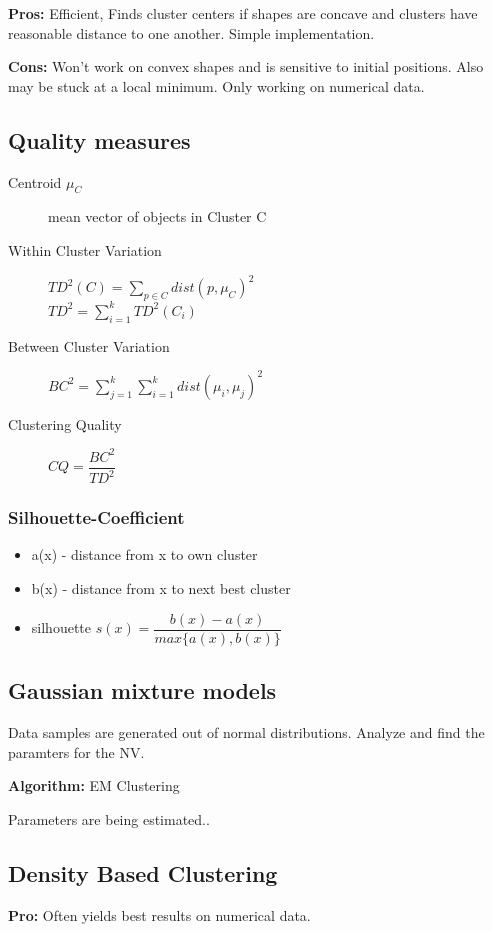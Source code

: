 \documentclass[fleqn, oneside, 10pt, titlepage]{article}
\begin{document}
\textbf{Pros:} Efficient, Finds cluster centers if shapes are concave and clusters have reasonable distance to one another. Simple implementation.

\textbf{Cons:} Won't work on convex shapes and is sensitive to initial positions. Also may be stuck at a local minimum. Only working on numerical data.

\subsection{Quality measures}
\begin{description}
	\item[Centroid $\mu_C$] mean vector of objects in Cluster C
	\item[Within Cluster Variation] $TD^2(C) = \sum_{p \in C} dist(p, \mu_C)^2$\\
	$TD^2 = \sum_{i=1}^k TD^2(C_i)$
	\item[Between Cluster Variation] $BC^2 = \sum_{j=1}^{k} \sum_{i=1}^{k} dist(\mu_i, \mu_j)^2$
	
	\item[Clustering Quality] $CQ = \dfrac{BC^2}{TD^2}$
\end{description}

\subsubsection{Silhouette-Coefficient}
\begin{itemize}
	\item a(x) - distance from x to own cluster
	\item b(x) - distance from x to next best cluster
	\item silhouette $s(x) = \dfrac{b(x) - a(x)}{max\{a(x), b(x)\}}$
\end{itemize}

\subsection{Gaussian mixture models}
Data samples are generated out of normal distributions. Analyze and find the paramters for the NV.

\textbf{Algorithm:} EM Clustering

Parameters are being estimated..

\subsection{Density Based Clustering}
\textbf{Pro:} Often yields best results on numerical data.
\end{document}
